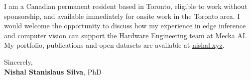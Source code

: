 \documentclass[11pt]{article}
\newcommand{\clName}{Nishal Stanislaus Silva}
\newcommand{\clSite}{https://nishal.xyz}
\newcommand{\clCompany}{Mecka AI}
\newcommand{\clTeam}{the Hardware Engineering team}
\begin{document}
I am a Canadian permanent resident based in Toronto, eligible to work without sponsorship, and available immediately for onsite work in the Toronto area. I would welcome the opportunity to discuss how my experience in edge inference and computer vision can support \clTeam{} at \clCompany{}. My portfolio, publications and open datasets are available at \href{\clSite}{nishal.xyz}.

\vspace{12pt}
Sincerely,\\[2pt]
\textbf{\clName}, PhD
\end{document}
